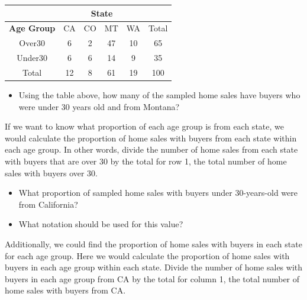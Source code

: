 \documentclass[
]{report}
\providecommand{\tightlist}{%
  \setlength{\itemsep}{0pt}\setlength{\parskip}{0pt}}
\begin{document}
\begin{center}
\begingroup
\setlength{\tabcolsep}{14pt} %
\renewcommand{\arraystretch}{2} %
\begin{tabular}{|c|c|c|c|c|c|}
\hline
 & \multicolumn{4}{|c|}{\textbf{State}} & \\ \hline
\textbf{Age Group} & CA & CO & MT & WA & Total \\ \hline
 Over30 & 6 & 2 & 47 & 10 & 65 \\ \hline
 Under30 & 6 & 6 & 14 & 9 & 35 \\ \hline
 Total & 12 & 8 & 61 & 19 & 100\\ \hline
\end{tabular}
\endgroup
\end{center}

\begin{itemize}
\tightlist
\item
  Using the table above, how many of the sampled home sales have buyers who were under 30 years old and from Montana?
\end{itemize}

\vspace{0.2in}

If we want to know what proportion of each age group is from each state, we would calculate the proportion of home sales with buyers from each state within each age group. In other words, divide the number of home sales from each state with buyers that are over 30 by the total for row 1, the total number of home sales with buyers over 30.

\begin{itemize}
\tightlist
\item
  What proportion of sampled home sales with buyers under 30-years-old were from California?
\end{itemize}

\vspace{0.3in}

\begin{itemize}
\tightlist
\item
  What notation should be used for this value?
\end{itemize}

\vspace{0.2in}

Additionally, we could find the proportion of home sales with buyers in each state for each age group. Here we would calculate the proportion of home sales with buyers in each age group within each state. Divide the number of home sales with buyers in each age group from CA by the total for column 1, the total number of home sales with buyers from CA.
\end{document}
